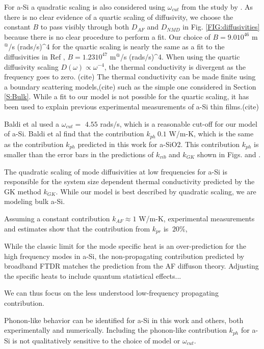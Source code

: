 \documentclass[aps,prb,onecolumn,preprint,superscriptaddress,footinbib,amsmath,amssymb,floatfix]{revtex4}
\begin{document}
For a-Si a quadratic scaling is also 
considered using $\omega_{cut}$ from the study by . As there is no clear 
evidence of a quartic scaling of diffusivity, we choose the constant 
$B$ to pass visibly through both $D_{AF}$ and $D_{NMD}$ in 
Fig. \ref{FIG:diffusivities} because there is no clear procedure 
to perform a fit. Our choice of $B=9.0 10^{46}$ m$^@$/s (rads$/$s)^4 
for the quartic scaling is nearly the same as a fit\cite{cahill_lower_1994} 
to the diffusivities in Ref , 
$B=1.23 10^{47}$ m$^@$/s (rads$/$s)^4. 
When using the quartic diffusivity scaling $D(\omega)\propto\omega^{-4}$, 
the thermal conductivity is divergent as the frequency goes to zero.
(cite) The thermal conductivity can be made finite using a boundary 
scattering models,(cite) such as the simple one considered in 
Section \ref{S:Bulk}. 
While a fit to our model is not possible for the quartic scaling, 
it has been used to explain previous experimental measurements of 
a-Si thin films.(cite)

Baldi et al used a $\omega_{cut}=$ $4.55$ rads$/$s, which is a 
reasonable 
cut-off for our model of a-Si.\cite{baldi_thermal_2008} 
Baldi et al find that the contribution $k_{ph}~0.1$ W/m-K, which is 
the same as the contribution $k_{ph}$ predicted in this work for 
a-SiO2. This contribution 
$k_{ph}$ is smaller than the error bars in the predictions of $k_{vib}$ 
and $k_{GK}$ shown in Figs. and .  

The quadratic scaling of mode diffusivities at low frequencies 
for a-Si 
is responsible for the system size dependent thermal conductivity 
predicted by the GK method $k_{GK}$. 
While our model is best described by 
quadratic scaling, we are modeling bulk a-Si. 



Assuming a constant contribution  
$k_{AF} \approx 1$ W/m-K, experimental 
measurements and estimates show that the contribution from 
$k_{pr}$ is $~20\%$,



While the classic limit for the mode specific heat is 
an over-prediction for the high frequency modes in a-Si, 
the non-propagating contribution 
predicted by broadband FTDR matches the prediction from the AF diffuson theory.
Adjusting the specific heats to include quantum statistical effects...

We can thus focus on the less understood low-frequency propagating contribution. 



Phonon-like behavior 
can be identified for a-Si in this work and others, 
both experimentally
\cite{liu_high_2009,yang_anomalously_2010,minnich_thermal_2011,
regner_broadband_2013} 
and numerically.
\cite{feldman_thermal_1993,feldman_numerical_1999,
mcgaughey_thermal_2004,he_heat_2011} 
Including the phonon-like contribution $k_{ph}$ 
for a-Si is not qualitatively sensitive 
to the choice of model
\cite{feldman_thermal_1993,feldman_numerical_1999,liu_high_2009} 
or $\omega_{cut}$.
\cite{feldman_thermal_1993,feldman_numerical_1999,
donadio_atomistic_2009,liu_high_2009,yang_anomalously_2010}
\end{document}
